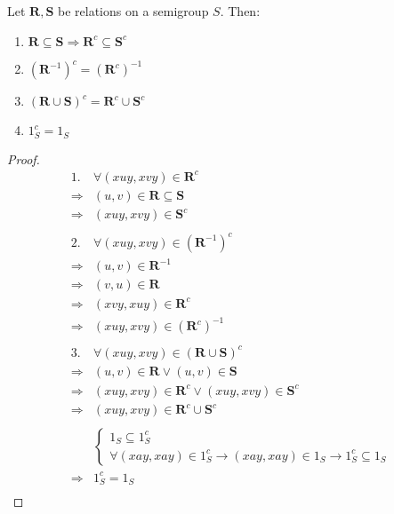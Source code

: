 \begin{Lem}\label{Lem:1.5.6}
    Let $\mathbf{R}, \mathbf{S}$ be relations on a semigroup $S$. Then:
    \begin{enumerate}
        \item $\mathbf{R} \subseteq \mathbf{S} \Rightarrow \mathbf{R}^c \subseteq \mathbf{S}^c$ 
        \item $(\mathbf{R}^{-1})^c = (\mathbf{R}^c)^{-1}$
        \item $(\mathbf{R} \cup \mathbf{S})^c = \mathbf{R}^c \cup \mathbf{S}^c$
        \item $1_S^c=1_S$
    \end{enumerate}
    \begin{proof}
        \begin{align*}
            1. & \forall (xuy, xvy)\in \mathbf{R}^c \\
            \Rightarrow& (u,v) \in \mathbf{R} \subseteq \mathbf{S}  \\
            \Rightarrow& (xuy, xvy) \in \mathbf{S}^c \\
            & \\
            2. & \forall (xuy, xvy) \in (\mathbf{R}^{-1})^c \\
            \Rightarrow& (u,v) \in \mathbf{R}^{-1}  \\
            \Rightarrow& (v,u) \in \mathbf{R}   \\
            \Rightarrow& (xvy, xuy) \in \mathbf{R}^c    \\
            \Rightarrow& (xuy, xvy) \in (\mathbf{R}^c)^{-1} \\
            & \\
            3. & \forall (xuy,xvy) \in (\mathbf{R}\cup \mathbf{S})^c    \\
            \Rightarrow& (u,v)\in \mathbf{R} \vee (u,v) \in \mathbf{S} \\
            \Rightarrow& (xuy, xvy) \in \mathbf{R}^c \vee (xuy, xvy)\in \mathbf{S}^c \\
            \Rightarrow& (xuy, xvy) \in \mathbf{R}^c \cup \mathbf{S}^c \\
            & \\
            &
            \begin{cases}
                1_S \subseteq 1_S^c \\
                \forall (xay,xay) \in 1_S^c\rightarrow (xay, xay)\in 1_S \rightarrow 1_S^c \subseteq 1_S
            \end{cases}         \\
            \Rightarrow & 1_S^c = 1_S       \\
        \end{align*}
    \end{proof}
\end{Lem}

